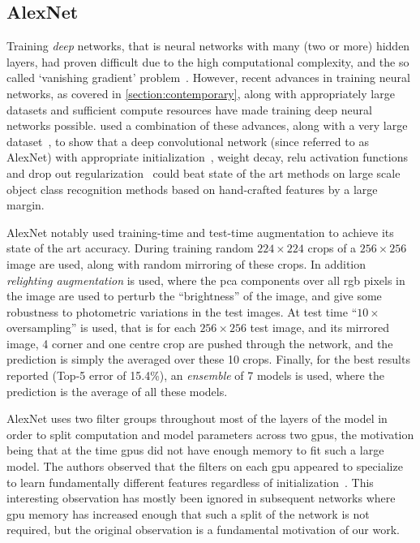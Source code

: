 \documentclass[thesis]{subfiles}
\begin{document}
\subsection{AlexNet}
Training \emph{deep} networks, that is neural networks with many (\ie{}two or more) hidden layers, had proven difficult due to the high computational complexity, and the so called `vanishing gradient' problem~\citep{bengio:ieeenn94}. However, recent advances in training neural networks, as covered in \cref{section:contemporary}, along with appropriately large datasets and sufficient compute resources have made training deep neural networks possible. \citet{Krizhevsky2012} used a combination of these advances, along with a very large dataset~\citep{ILSVRC2015}, to show that a deep convolutional network (since referred to as AlexNet) with appropriate initialization~\citep{Sutskever2013momentum}, weight decay, \gls{relu} activation functions~\citep{conf/icml/NairH10} and drop out regularization~\citep{Hinton2012} could beat state of the art methods on large scale object class recognition methods based on hand-crafted features by a large margin. 

AlexNet notably used training-time and test-time augmentation to achieve its state of the art accuracy. During training random $224 \times 224$ crops of a $256 \times 256$ image are used, along with random mirroring of these crops. In addition \emph{relighting augmentation} is used, where the \gls{pca} components over all \gls{rgb} pixels in the image are used to perturb the ``brightness'' of the image, and give some robustness to photometric variations in the test images. At test time ``$10\times$ oversampling'' is used, that is for each $256\times 256$ test image, and its mirrored image, 4 corner and one centre crop are pushed through the network, and the prediction is simply the averaged over these 10 crops. Finally, for the best results reported (Top-5 error of 15.4\%), an \emph{ensemble} of 7 models is used, where the prediction is the average of all these models. 

AlexNet uses two filter groups throughout most of the layers of the model in order to split computation and model parameters across two \gls{gpu}s, the motivation being that at the time \gls{gpu}s did not have enough memory to fit such a large model. The authors observed that the filters on each \gls{gpu} appeared to specialize to learn fundamentally different features regardless of initialization~\citep{Krizhevsky2012}. This interesting observation has mostly been ignored in subsequent networks where \gls{gpu} memory has increased enough that such a split of the network is not required, but the original observation is a fundamental motivation of our work.
\end{document}
